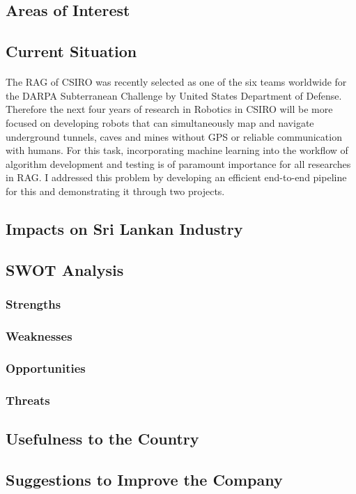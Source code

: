 \subsection{Areas of Interest}
\subsection{Current Situation}

\paragraph{}
The RAG of CSIRO was recently selected as one of the six teams worldwide for the DARPA Subterranean Challenge by United States Department of Defense. Therefore the next four years of research in Robotics in CSIRO will be more focused on developing robots that can simultaneously map and navigate underground tunnels, caves and mines without GPS or reliable communication with humans. For this task, incorporating machine learning into the workflow of algorithm development and testing is of paramount importance for all researches in RAG. I addressed this problem by developing an efficient end-to-end pipeline for this and demonstrating it through two projects.

\subsection{Impacts on Sri Lankan Industry}

\subsection{SWOT Analysis}
\subsubsection{Strengths}
\subsubsection{Weaknesses}
\subsubsection{Opportunities}
\subsubsection{Threats}

\subsection{Usefulness to the Country}
\subsection{Suggestions to Improve the Company}